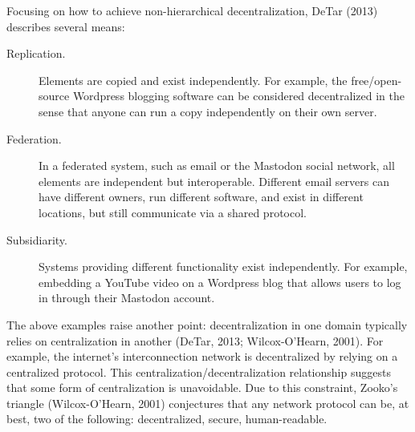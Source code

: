 Focusing on how to achieve non-hierarchical decentralization, DeTar (2013) describes several means:

\begin{description}
\item[Replication.]{Elements are copied and exist independently. For example, the free/open-source Wordpress blogging software can be considered decentralized in the sense that anyone can run a copy independently on their own server.}
\item[Federation.]{In a federated system, such as email or the Mastodon social network, all elements are independent but interoperable. Different email servers can have different owners, run different software, and exist in different locations, but still communicate via a shared protocol.}
\item[Subsidiarity.]{Systems providing different functionality exist independently. For example, embedding a YouTube video on a Wordpress blog that allows users to log in through their Mastodon account.}
\end{description}

The above examples raise another point: decentralization in one domain typically relies on centralization in another (DeTar, 2013; Wilcox-O'Hearn, 2001). For example, the internet's interconnection network is decentralized by relying on a centralized protocol. This centralization/decentralization relationship suggests that some form of centralization is unavoidable. Due to this constraint, Zooko's triangle (Wilcox-O'Hearn, 2001) conjectures that any network protocol can be, at best, two of the following: decentralized, secure, human-readable.

